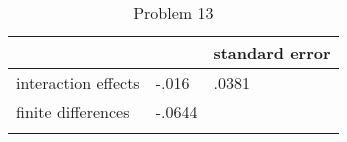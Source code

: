 \begin{table}[h!]
\caption{Problem 13}
	\label{q13}
\begin{center}
\begin{tabular}{lll}
\toprule
&& standard error \\
\midrule
interaction effects & -.016 & .0381 \\ \addlinespace
finite differences & -.0644& \\ \addlinespace
\bottomrule
\end{tabular}
\end{center}
\end{table}
